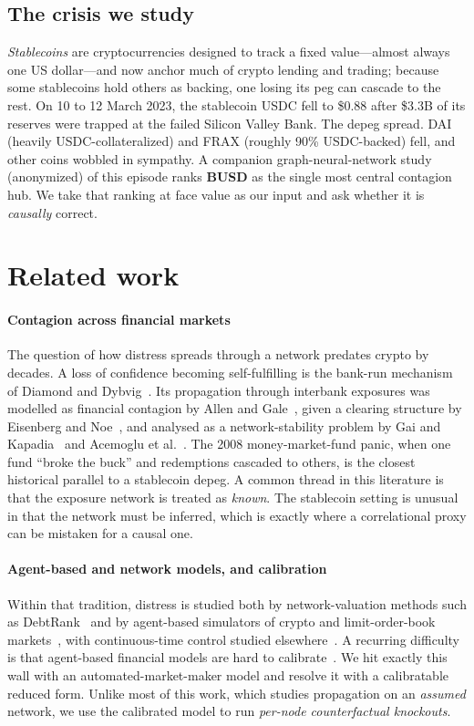 \documentclass[sigconf,anonymous]{acmart}
\begin{document}
\subsection{The crisis we study}
\emph{Stablecoins} are cryptocurrencies designed to track a fixed value---almost always one
US dollar---and now anchor much of crypto lending and trading; because some stablecoins hold
others as backing, one losing its peg can cascade to the rest. On 10 to 12 March 2023, the
stablecoin USDC fell to \$0.88 after \$3.3B of its reserves were trapped at
the failed Silicon Valley Bank. The depeg spread. DAI (heavily USDC-collateralized) and FRAX (roughly
90\% USDC-backed) fell, and other coins wobbled in sympathy. A companion graph-neural-network study
(anonymized) of this episode ranks \textbf{BUSD} as the single most central contagion hub. We take
that ranking at face value as our input and ask whether it is \emph{causally} correct.

\section{Related work}
\paragraph{Contagion across financial markets} The question of how distress spreads through a network
predates crypto by decades. A loss of confidence becoming self-fulfilling is the bank-run mechanism of
Diamond and Dybvig~\cite{diamond1983bank}. Its propagation through interbank exposures was modelled as
financial contagion by Allen and Gale~\cite{allen2000financial}, given a clearing structure by Eisenberg
and Noe~\cite{eisenberg2001systemic}, and analysed as a network-stability problem by Gai and
Kapadia~\cite{gai2010contagion} and Acemoglu et al.~\cite{acemoglu2015systemic}. The 2008 money-market-fund
panic, when one fund ``broke the buck'' and redemptions cascaded to others, is the closest historical
parallel to a stablecoin depeg. A common thread in this literature is that the exposure network is
treated as \emph{known}. The stablecoin setting is unusual in that the network must be inferred, which is
exactly where a correlational proxy can be mistaken for a causal one.

\paragraph{Agent-based and network models, and calibration} Within that tradition, distress is studied
both by network-valuation methods such as DebtRank~\cite{battiston2012debtrank} and by agent-based
simulators of crypto and limit-order-book markets~\cite{gu2024spoofability}, with continuous-time control
studied elsewhere~\cite{huang2025ctrl}. A recurring difficulty is that agent-based financial models are
hard to calibrate~\cite{mohl2025jaxmarl}. We hit exactly this wall with an automated-market-maker model
and resolve it with a calibratable reduced form. Unlike most of this work, which studies propagation on
an \emph{assumed} network, we use the calibrated model to run \emph{per-node counterfactual knockouts}.
\end{document}
